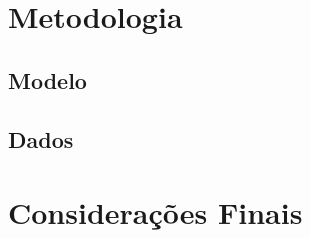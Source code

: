 \documentclass[12pt,oneside,a4paper,chapter=TITLE,english,brazil,sumario=abnt-6027-2012]{abntex2}
\begin{document}

\chapter{Metodologia}

\section{Modelo}

\section{Dados}

\chapter{Considerações Finais}










\end{document}
